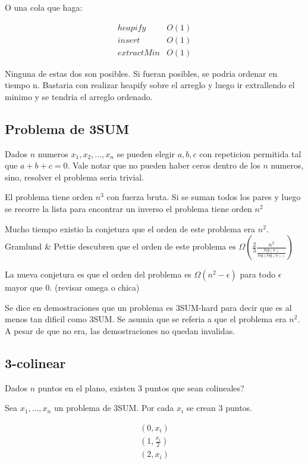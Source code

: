 \documentclass[12pt]{article}
\begin{document}
O una cola que haga:

\begin{align}
heapify & O(1) \\
insert & O(1) \\
extractMin & O(1)
\end{align}

Ninguna de estas dos son posibles. Si fueran posibles, se podria ordenar en tiempo n. Bastaria con realizar heapify sobre el arreglo y luego ir extrallendo el minimo y se tendria el arreglo ordenado.

\subsection{Problema de 3SUM}

Dados $n$ numeros $x_1, x_2, ... , x_n$ se pueden elegir $a,b,c$ con repeticion permitida tal que $a + b + c = 0$. Vale notar que no pueden haber ceros dentro de los $n$ numeros, sino, resolver el problema seria trivial.

El problema tiene orden $n^3$ con fuerza bruta.
Si se suman todos los pares y luego se recorre la lista para encontrar un inverso el problema tiene orden $n^2$

Mucho tiempo existio la conjetura que el orden de este problema era $n^2$. Gramlund \& Pettie descubren que el orden de este problema es $\Omega(\frac{2}{3}\frac{n^2}{\frac{log(n)}{log(log(n))}})$

La nueva conjetura es que el orden del problema es $\Omega(n^2 - \epsilon)$ para todo $\epsilon$ mayor que $0$. (revisar omega o chica)

Se dice en demostraciones que un problema es 3SUM-hard para decir que es al menos tan dificil como 3SUM. Se asumia que se referia a que el problema era $n^2$. A pesar de que no era, las demostraciones no quedan invalidas.

\subsection{3-colinear}

Dados $n$ puntos en el plano, existen $3$ puntos que sean colineales?

Sea $x_1, ... , x_n$ un problema de 3SUM. Por cada $x_i$ se crean $3$ puntos.

\begin{align}
(0, x_i) \\
(1, \frac{x_i}{2}) \\
(2, x_i)
\end{align}
\end{document}
